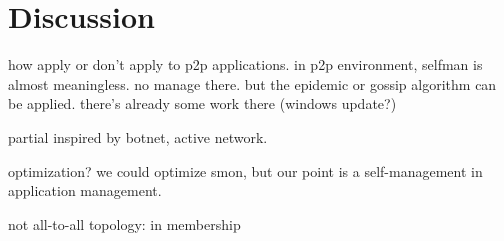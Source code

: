 \section{Discussion}
\label{sec:discuss}

how apply or don't apply to p2p applications. in p2p
environment, selfman is almost meaningless. no manage there. but
the epidemic or gossip algorithm can be applied. there's already
some work there (windows update?)

partial inspired by botnet, active network.

optimization? we could optimize smon, but our point is a
self-management in application management.

not all-to-all topology: in membership
